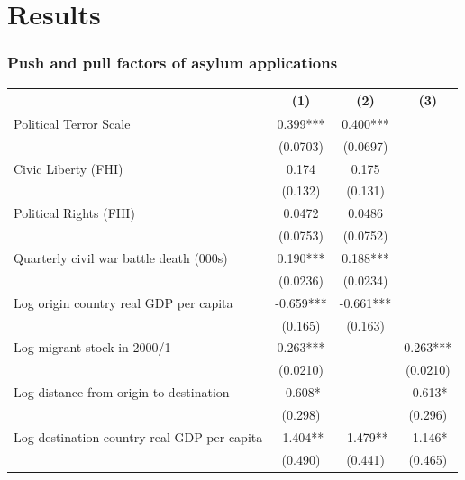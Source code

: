 \documentclass[compress, xcolor = {table,xcdraw}]{beamer}
\begin{document}
\section{Results}


\begin{frame}
\frametitle{Push and pull factors of asylum applications}
\begin{table}
	\centering
	\tiny
	\begin{tabular}{l*{3}{c}}
		\hline\hline
		&\multicolumn{1}{c}{(1)}         &\multicolumn{1}{c}{(2)}         &\multicolumn{1}{c}{(3)}         \\
		\hline
		Political Terror Scale&       0.399*** &       0.400***&                     \\
		&    (0.0703)         &    (0.0697)         &                     \\
		[0.2em]
		Civic Liberty (FHI) &       0.174         &       0.175         &                     \\
		&     (0.132)         &     (0.131)         &                     \\
		[0.2em]
		Political Rights (FHI)&      0.0472         &      0.0486         &                     \\
		&    (0.0753)         &    (0.0752)         &                     \\
		[0.2em]
		Quarterly civil war battle death (000s)&       0.190***&       0.188***&                     \\
		&    (0.0236)         &    (0.0234)         &                     \\
		[0.2em]
		Log origin country real GDP per capita&      -0.659***&      -0.661***&                     \\
		&     (0.165)         &     (0.163)         &                     \\
		[0.7em]
		Log migrant stock in 2000/1&       0.263***&                     &       0.263***\\
		&    (0.0210)         &                     &    (0.0210)         \\
		[0.2em]
		Log distance from origin to destination&      -0.608*  &                     &      -0.613*  \\
		&     (0.298)         &                     &     (0.296)         \\
		[0.7em]
		Log destination country real GDP per capita&      -1.404** &      -1.479** &      -1.146*  \\
		&     (0.490)         &     (0.441)         &     (0.465)         \\

\end{tabular}
\end{table}
\end{frame}
\end{document}
